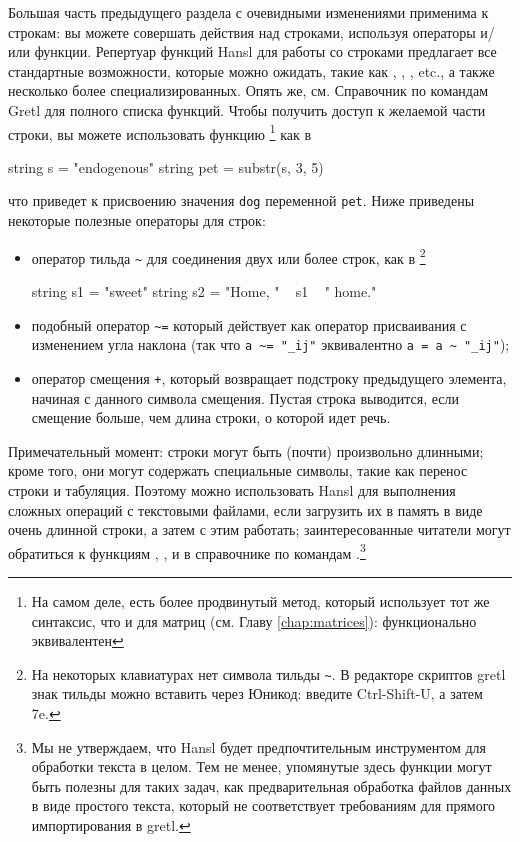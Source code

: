 Большая часть предыдущего раздела с очевидными изменениями применима к
строкам: вы можете совершать действия над строками, используя
операторы и/или функции. Репертуар функций Hansl для работы со
строками предлагает все стандартные возможности, которые можно
ожидать, такие как , , , etc., а
также несколько более специализированных. Опять же, см. Справочник по
командам Gretl для полного списка функций.  Чтобы получить доступ к
желаемой части строки, вы можете использовать функцию
\footnote{На самом деле, есть более продвинутый метод,
  который использует тот же синтаксис, что и для матриц (см. Главу
  \ref{chap:matrices}):  функционально
  эквивалентен } как в
\begin{code}
  string s = "endogenous"
  string pet = substr(s, 3, 5)
\end{code}
что приведет к присвоению значения \texttt{dog} переменной
\texttt{pet}. Ниже приведены некоторые полезные операторы для строк:
\begin{itemize}
\item оператор тильда \verb|~| для соединения двух или более строк,
  как в \footnote{На некоторых клавиатурах нет символа тильды
    \verb|~|. В редакторе скриптов gretl знак тильды можно вставить
    через Юникод: введите Ctrl-Shift-U, а затем 7e.}
  \begin{code}
    string s1 = "sweet"
    string s2 = "Home, " ~ s1 ~ " home."
  \end{code}
\item подобный оператор \verb|~=| который действует как оператор
  присваивания с изменением угла наклона (так что \verb|a ~= "_ij"|
  эквивалентно \verb|a = a ~ "_ij"|);
\item оператор смещения \texttt{+}, который возвращает подстроку
  предыдущего элемента, начиная с данного символа смещения. Пустая
  строка выводится, если смещение больше, чем длина строки, о которой
  идет речь.
\end{itemize}

Примечательный момент: строки могут быть (почти) произвольно длинными;
кроме того, они могут содержать специальные символы, такие как перенос
строки и табуляция. Поэтому можно использовать Hansl для выполнения
сложных операций с текстовыми файлами, если загрузить их в память в
виде очень длинной строки, а затем с этим работать; заинтересованные
читатели могут обратиться к функциям , ,
 и  в справочнике по командам
\GCR.\footnote{Мы не утверждаем, что Hansl будет предпочтительным
  инструментом для обработки текста в целом. Тем не менее, упомянутые
  здесь функции могут быть полезны для таких задач, как
  предварительная обработка файлов данных в виде простого текста,
  который не соответствует требованиям для прямого импортирования в
  gretl.}

